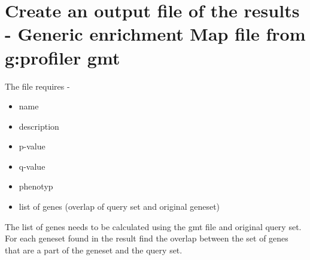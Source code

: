 \documentclass[
]{book}
\providecommand{\tightlist}{%
  \setlength{\itemsep}{0pt}\setlength{\parskip}{0pt}}
\begin{document}
\hypertarget{create-an-output-file-of-the-results---generic-enrichment-map-file-from-gprofiler-gmt}{%
\section{Create an output file of the results - Generic enrichment Map file from g:profiler gmt}\label{create-an-output-file-of-the-results---generic-enrichment-map-file-from-gprofiler-gmt}}

The file requires -

\begin{itemize}
\tightlist
\item
  name
\item
  description
\item
  p-value
\item
  q-value
\item
  phenotyp
\item
  list of genes (overlap of query set and original geneset)
\end{itemize}

The list of genes needs to be calculated using the gmt file and original query set. For each geneset found in the result find the overlap between the set of genes that are a part of the geneset and the query set.
\end{document}
